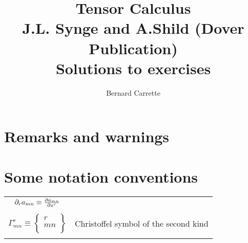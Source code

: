 \documentclass{ut-thesis}
\author{Bernard Carrette}
\title{Tensor Calculus\\J.L. Synge and A.Shild (Dover Publication)\\ Solutions to exercises}
\begin{document}
\maketitle

\section*{Remarks and warnings}
\section*{Some notation conventions}
\begin{center}
\begin{tabular}{ c c  }
$\partial_ra_{mn}\equiv \pdv{a_{m n}}{x^r}$ & \\\\
$\Gamma^r_{mn} \equiv 
\begin{Bmatrix}
r\\
m n\\
\end{Bmatrix}$ & Christoffel symbol of the second kind\\\\

\end{tabular}
\end{center}

\tableofcontents



%
%
%
\end{document}
